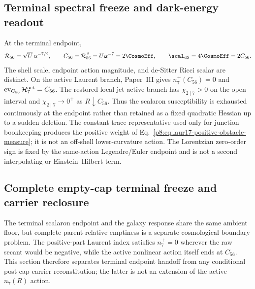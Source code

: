\documentclass[12pt,a4paper]{article}
\begin{document}
\subsection{Terminal spectral freeze and dark-energy readout}
\label{p8:darkenergy}

At the terminal endpoint,
\begin{equation}
\label{p8:eq:terminal-dark-energy-dictionary}
 \mathcal R_{56}=\sqrt U\,\alpha^{-7/2},
 \qquad
 C_{56}=\mathcal R_{56}^{\,2}=U\alpha^{-7}=2\CosmoEff,
 \qquad
 \scal_{\rm dS}=4\CosmoEff=2C_{56}.
\end{equation}
The shell scale, endpoint action magnitude, and de-Sitter Ricci scalar are
distinct.  On the active Laurent branch, Paper~III gives
\(n_7^+(C_{56})=0\) and
\(\operatorname{ev}_{C_{56}}\mathcal H_7^{\rm act}=C_{56}\).
The restored local-jet active branch has
\(\chi_{2\mid7}>0\) on the open interval and
\(\chi_{2\mid7}\to0^+\) as \(R\downarrow C_{56}\).  Thus the scalaron
susceptibility is exhausted continuously at the endpoint rather than retained
as a fixed quadratic Hessian up to a sudden deletion.  The constant
trace representative used only for junction bookkeeping produces the
positive weight of Eq.~\eqref{p8:eq:laur17-positive-obstacle-measure}; it is
not an off-shell lower-curvature action.  The Lorentzian zero-order sign is fixed by the same-action Legendre/Euler
endpoint and is not a second interpolating or Einstein--Hilbert term.


\subsection{Complete empty-cap terminal freeze and carrier reclosure}
\label{p8:sec:complete-cap-reclosure}
The terminal scalaron endpoint and the galaxy response share the same ambient
floor, but complete parent-relative emptiness is a separate cosmological
boundary problem.  The positive-part Laurent index satisfies \(n_7^+=0\)
wherever the raw secant would be negative, while the active nonlinear action
itself ends at \(C_{56}\).  This section therefore separates terminal endpoint
handoff from any conditional post-cap carrier reconstitution; the latter is
not an extension of the active \(n_7(R)\) action.
\end{document}
